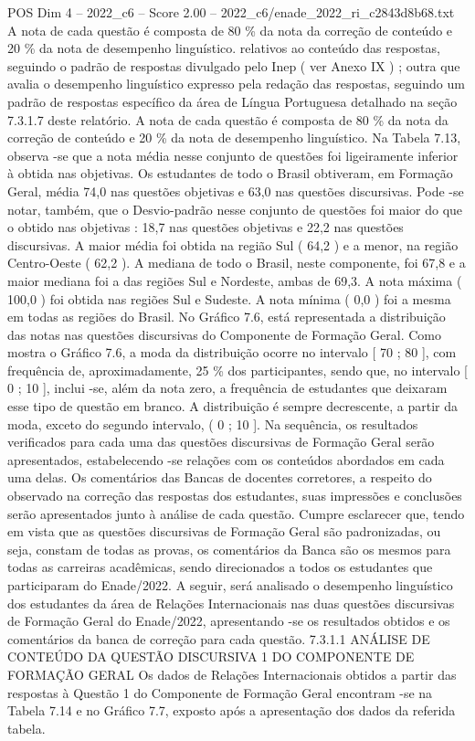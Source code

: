 \begin{textsample}{POS Dim 4 – 2022\_c6 – Score 2.00 – 2022\_c6/enade\_2022\_ri\_c2843d8b68.txt}
A nota de cada questão é composta de 80 \% da nota da correção de conteúdo e 20 \% da nota de desempenho linguístico. relativos ao conteúdo das respostas, seguindo o padrão de respostas divulgado pelo Inep ( ver Anexo IX ) ; outra que avalia o desempenho linguístico expresso pela redação das respostas, seguindo um padrão de respostas específico da área de Língua Portuguesa detalhado na seção 7.3.1.7 deste relatório.
A nota de cada questão é composta de 80 \% da nota da correção de conteúdo e 20 \% da nota de desempenho linguístico.
Na Tabela 7.13, observa -se que a nota média nesse conjunto de questões foi ligeiramente inferior à obtida nas objetivas.
Os estudantes de todo o Brasil obtiveram, em Formação Geral, média 74,0 nas questões objetivas e 63,0 nas questões discursivas.
Pode -se notar, também, que o Desvio-padrão nesse conjunto de questões foi maior do que o obtido nas objetivas : 18,7 nas questões objetivas e 22,2 nas questões discursivas.
A maior média foi obtida na região Sul ( 64,2 ) e a menor, na região Centro-Oeste ( 62,2 ).
A mediana de todo o Brasil, neste componente, foi 67,8 e a maior mediana foi a das regiões Sul e Nordeste, ambas de 69,3.
A nota máxima ( 100,0 ) foi obtida nas regiões Sul e Sudeste.
A nota mínima ( 0,0 ) foi a mesma em todas as regiões do Brasil.
No Gráfico 7.6, está representada a distribuição das notas nas questões discursivas do Componente de Formação Geral.
Como mostra o Gráfico 7.6, a moda da distribuição ocorre no intervalo [ 70 ; 80 ], com frequência de, aproximadamente, 25 \% dos participantes, sendo que, no intervalo [ 0 ; 10 ], inclui -se, além da nota zero, a frequência de estudantes que deixaram esse tipo de questão em branco.
A distribuição é sempre decrescente, a partir da moda, exceto do segundo intervalo, ( 0 ; 10 ].
Na sequência, os resultados verificados para cada uma das questões discursivas de Formação Geral serão apresentados, estabelecendo -se relações com os conteúdos abordados em cada uma delas.
Os comentários das Bancas de docentes corretores, a respeito do observado na correção das respostas dos estudantes, suas impressões e conclusões serão apresentados junto à análise de cada questão.
Cumpre esclarecer que, tendo em vista que as questões discursivas de Formação Geral são padronizadas, ou seja, constam de todas as provas, os comentários da Banca são os mesmos para todas as carreiras acadêmicas, sendo direcionados a todos os estudantes que participaram do Enade/2022.
A seguir, será analisado o desempenho linguístico dos estudantes da área de Relações Internacionais nas duas questões discursivas de Formação Geral do Enade/2022, apresentando -se os resultados obtidos e os comentários da banca de correção para cada questão. 7.3.1.1 ANÁLISE DE CONTEÚDO DA QUESTÃO DISCURSIVA 1 DO COMPONENTE DE FORMAÇÃO GERAL Os dados de Relações Internacionais obtidos a partir das respostas à Questão 1 do Componente de Formação Geral encontram -se na Tabela 7.14 e no Gráfico 7.7, exposto após a apresentação dos dados da referida tabela.

\end{textsample}
